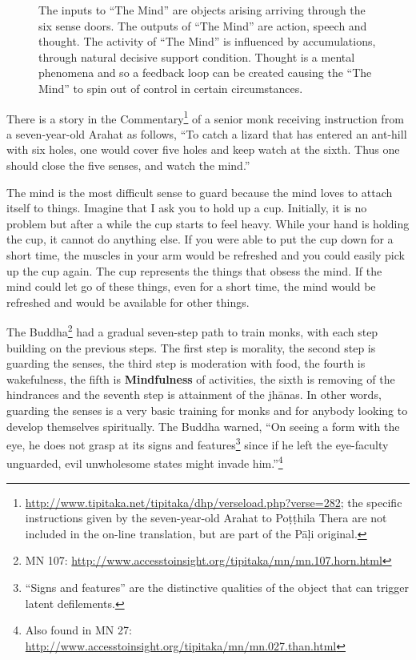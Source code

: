 \begin{figure}[h]
\centering

\caption{The inputs to “The Mind” are objects arising arriving through the six sense doors. The outputs of “The Mind” are action, speech and thought. The activity of “The Mind” is influenced by accumulations, through natural decisive support condition. Thought is a mental phenomena and so a feedback loop can be created causing the “The Mind” to spin out of control in certain circumstances.}
\label{fig:Feedback}
\end{figure}

There is a story in the Commentary\footnote{\url{http://www.tipitaka.net/tipitaka/dhp/verseload.php?verse=282}; the specific instructions given by the seven-year-old Arahat to Poṭṭhila Thera are not included in the on-line translation, but are part of the Pāḷi original.} of a senior monk receiving instruction from a seven-year-old Arahat as follows, “To catch a lizard that has entered an ant-hill with six holes, one would cover five holes and keep watch at the sixth. Thus one should close the five senses, and watch the mind.”

The mind is the most difficult sense to guard because the mind loves to attach itself to things. Imagine that I ask you to hold up a cup. Initially, it is no problem but after a while the cup starts to feel heavy. While your hand is holding the cup, it cannot do anything else. If you were able to put the cup down for a short time, the muscles in your arm would be refreshed and you could easily pick up the cup again. The cup represents the things that obsess the mind. If the mind could let go of these things, even for a short time, the mind would be refreshed and would be available for other things.

The Buddha\footnote{MN 107: \url{http://www.accesstoinsight.org/tipitaka/mn/mn.107.horn.html}} had a gradual seven-step path to train monks, with each step building on the previous steps. The first step is morality, the second step is guarding the senses, the third step is moderation with food, the fourth is wakefulness, the fifth is \textbf{Mindfulness} of activities, the sixth is removing of the hindrances and the seventh step is attainment of the jhānas. In other words, guarding the senses is a very basic training for monks and for anybody looking to develop themselves spiritually. The Buddha warned, “On seeing a form with the eye, he does not grasp at its signs and features\footnote{“Signs and features” are the distinctive qualities of the object that can trigger latent defilements.} since if he left the eye-faculty unguarded, evil unwholesome states might invade him.”\footnote{Also found in MN 27: \url{http://www.accesstoinsight.org/tipitaka/mn/mn.027.than.html}}


